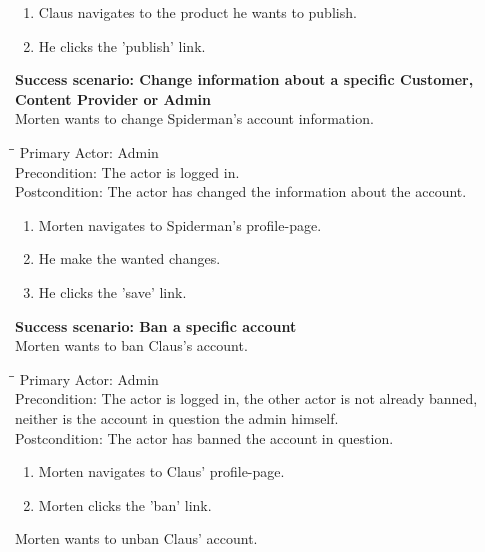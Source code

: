 \begin{enumerate} \setlength{\itemsep}{-1mm}
	\item Claus navigates to the product he wants to publish.
	\item He clicks the 'publish' link.
\end{enumerate}
\vspace{3mm}
\textbf{Success scenario: Change information about a specific Customer, Content Provider or Admin} \\
Morten wants to change Spiderman's account information.
\begin{tabbing}
\hspace{5mm}\=\hspace{26mm}\=\kill
\>Primary Actor:\> Admin\\
\>Precondition:\> The actor is logged in.\\
\>Postcondition:\> The actor has changed the information about the account.
\end{tabbing}
\begin{enumerate} \setlength{\itemsep}{-1mm}
	\item Morten navigates to Spiderman's profile-page.
	\item He make the wanted changes.
	\item He clicks the 'save' link.
\end{enumerate}
\vspace{3mm}
\textbf{Success scenario: Ban a specific account} \\
Morten wants to ban Claus's account.
\begin{tabbing}
\hspace{5mm}\=\hspace{26mm}\=\kill
\>Primary Actor:\> Admin\\
\>Precondition:\> The actor is logged in, the other actor is not already banned,\\ \hspace{85px} neither is the account in question the admin himself.\\
\>Postcondition:\> The actor has banned the account in question.
\end{tabbing}
\begin{enumerate} \setlength{\itemsep}{-1mm}
	\item Morten navigates to Claus' profile-page.
	\item Morten clicks the 'ban' link.
\end{enumerate}
\vspace{3mm}
Morten wants to unban Claus' account.
